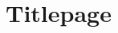 \documentclass[aspectratio=1610,12pt]{beamer}
\begin{document}
\renewcommand{\thefootnote}{/*\!/}
\section[•]{Titlepage}
\begin{frame}\titlepage\end{frame}
\end{document}
